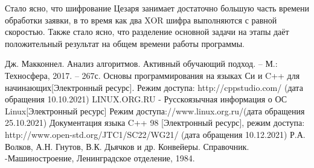 \documentclass[12pt,a4paper]{report}
\begin{document}
Стало ясно, что шифрование Цезаря занимает достаточно большую часть времени обработки заявки, в то время как 
два XOR шифра выполняются с равной скоростью. Также стало ясно, что разделение основной задачи на этапы даёт 
положительный результат на общем времени работы программы. 



\newpage
\renewcommand\bibname{Список литературы}
\makeatletter %
\def\@biblabel#1{#1. }
\makeatother
\begin{thebibliography}{2}
	 Дж. Макконнел. Анализ алгоритмов. Активный обучающий подход. -- М.: Техносфера, 2017. -- 267с.
	Основы программирования на языках Си и C++ для начинающих[Электронный ресурс]. Режим доступа: http://cppstudio.com/ (дата обращения 10.10.2021)
	LINUX.ORG.RU - Русскоязычная информация о ОС Linux[Электронный ресурс] Режим доступа://www.linux.org.ru/(дата обращения 25.10.2021)
	  Документация языка C++ 98 [Электронный ресурс], режим доступа: http://www.open-std.org/JTC1/SC22/WG21/ (дата обращения 10.12.2021)
	\bibitem{} Р.А. Волков, А.Н. Гнутов, В.К. Дьячков и др. Конвейеры. Справочник. -Машиностроение, Ленинградское отделение, 1984.
	
\end{thebibliography}
\end{document}
